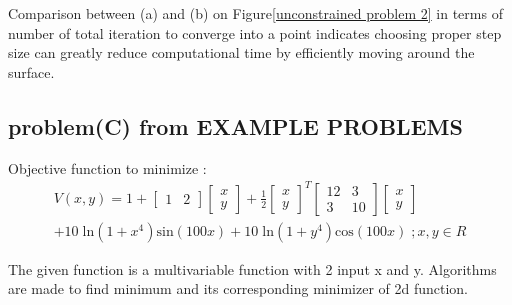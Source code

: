 \documentclass[twoside,11pt]{article}
\begin{document}
Comparison between (a) and (b) on Figure\ref{unconstrained problem 2} in terms of number of total iteration to converge into a point indicates choosing proper step size can greatly reduce computational time by efficiently moving around the surface. 

\subsection*{problem(C) from EXAMPLE PROBLEMS}
Objective function to minimize :
\begin{equation}
  \begin{array}{l}
    V\left(x,y\right)=1+\left\lbrack \begin{array}{cc}
    1 & 2
    \end{array}\right\rbrack \left\lbrack \begin{array}{c}
    x\\
    y
    \end{array}\right\rbrack +\frac{1}{2}{\left\lbrack \begin{array}{c}
    x\\
    y
    \end{array}\right\rbrack }^T \left\lbrack \begin{array}{cc}
    12 & 3\\
    3 & 10
    \end{array}\right\rbrack \left\lbrack \begin{array}{c}
    x\\
    y
    \end{array}\right\rbrack \\
    +10\;\mathrm{ln}\left(1+x^4 \right)\mathrm{sin}\left(100x\right)+10\;\mathrm{ln}\left(1+y^4 \right)\mathrm{cos}\left(100x\right)\;;x,y\in R
  \end{array}
\end{equation}

The given function is a multivariable function with 2 input x and y. Algorithms are made to find minimum and its corresponding minimizer of 2d function.
\end{document}
